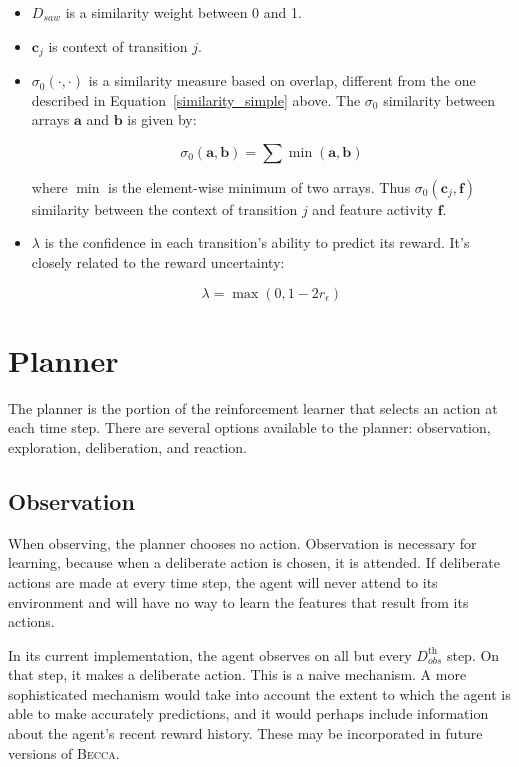 \begin{itemize}
\item $D_{saw}$ is a similarity weight between 0 and 1.
\item $\mathbf{c}_j$ is context of transition $j$. 
\item $\sigma_0(\cdot,\cdot)$ is a similarity measure based on overlap, different from the one described in Equation~\ref{similarity_simple} above. The $\sigma_0$ similarity between arrays $\mathbf{a}$ and $\mathbf{b}$ is given by:

\begin{equation}
\sigma_0(\mathbf{a}, \mathbf{b}) = \sum \min (\mathbf{a}, \mathbf{b})
\end{equation}

where $\min$ is the element-wise minimum of two arrays. Thus $\sigma_0(\mathbf{c}_j, \mathbf{f})$ similarity between the context of transition $j$ and feature activity $\mathbf{f}$.

\item $\lambda$ is the confidence in each transition's ability to predict its reward. It's closely related to the reward uncertainty:

\begin{equation}
\lambda = \max(0, 1 - 2 r_\epsilon)
\end{equation}
\end{itemize}

\section{Planner}
The planner is the portion of the reinforcement learner that selects an action at each time step. There are several options available to the planner: observation, exploration, deliberation, and reaction.

\subsection{Observation}
When observing, the planner chooses no action. Observation is necessary for learning, because when a deliberate action is chosen, it is attended. If deliberate actions are made at every time step, the agent will never attend to its environment and will have no way to learn the features that result from its actions.

In its current implementation, the agent observes on all but every $D_{obs}^{\mbox{th}}$ step. On that step, it makes a deliberate action. This is a naive mechanism. A more sophisticated mechanism would take into account the extent to which the agent is able to make accurately predictions, and it would perhaps include information about the agent's recent reward history. These may be incorporated in future versions of \textsc{Becca}.

